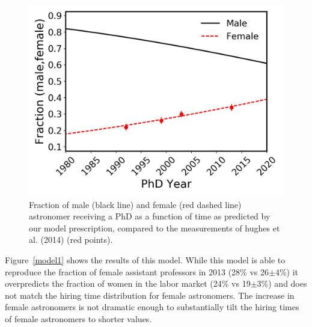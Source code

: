 \documentclass[modern]{aastex62}
\begin{document}
\begin{figure}[!hbt]
\center
\includegraphics[scale=.6]{f_phd.png}
\caption{Fraction of male (black line) and female (red dashed line) astronomer receiving a PhD as a function of time as predicted by our model prescription, compared to the measurements of hughes et al. (2014) (red points).\label{f_phd}}
\end{figure}

Figure~\ref{model1} shows the results of this model. While this model is able to reproduce the fraction of female assistant professors in 2013 (28\% vs 26$\pm$4\%) it overpredicts the fraction of women in the labor market (24\% vs 19$\pm$3\%) and does not match the hiring time distribution for female astronomers. The increase in female astronomers is not dramatic enough to substantially tilt the hiring times of female astronomers to shorter values. 
\end{document}

